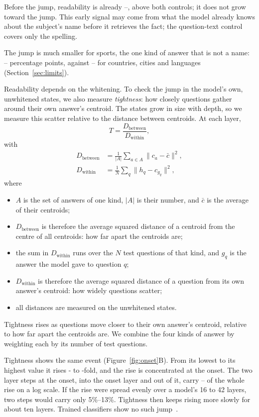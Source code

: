 Before the jump, readability is already \EarlyMin{}--\EarlyMax{}, above both controls; it does not grow toward the jump. This early signal may come from what the model already knows about the subject's name before it retrieves the fact; the question-text control covers only the spelling.

The jump is much smaller for sports, the one kind of answer that is not a name: \SportJumpMin{}--\SportJumpMax{} percentage points, against \NamesJumpMin{}--\NamesJumpMax{} for countries, cities and languages (Section~\ref{sec:limits}).

Readability depends on the whitening. To check the jump in the model's own, unwhitened states, we also measure \emph{tightness}: how closely questions gather around their own answer's centroid. The states grow in size with depth, so we measure this scatter relative to the distance between centroids. At each layer,
\begin{equation}
T = \frac{D_{\text{between}}}{D_{\text{within}}},
\label{eq:tight}
\end{equation}
with
\begin{align*}
D_{\text{between}} &= \frac{1}{|A|} \sum_{a \in A} \lVert c_a - \bar{c} \rVert^2, \\
D_{\text{within}} &= \frac{1}{N} \sum_{q} \lVert h_q - c_{g_q} \rVert^2,
\end{align*}
where
\begin{itemize}\itemsep0pt
\item $A$ is the set of answers of one kind, $|A|$ is their number, and $\bar{c}$ is the average of their centroids;
\item $D_{\text{between}}$ is therefore the average squared distance of a centroid from the centre of all centroids: how far apart the centroids are;
\item the sum in $D_{\text{within}}$ runs over the $N$ test questions of that kind, and $g_q$ is the answer the model gave to question $q$;
\item $D_{\text{within}}$ is therefore the average squared distance of a question from its own answer's centroid: how widely questions scatter;
\item all distances are measured on the unwhitened states.
\end{itemize}
Tightness rises as questions move closer to their own answer's centroid, relative to how far apart the centroids are. We combine the four kinds of answer by weighting each by its number of test questions.

Tightness shows the same event (Figure~\ref{fig:onset}B). From its lowest to its highest value it rises \TightFoldMin{}- to \TightFoldMax{}-fold, and the rise is concentrated at the onset. The two layer steps at the onset, into the onset layer and out of it, carry \TightAtJumpMin{}--\TightAtJumpMax{} of the whole rise on a log scale. If the rise were spread evenly over a model's 16 to 42 layers, two steps would carry only 5\%--13\%. Tightness then keeps rising more slowly for about ten layers. Trained classifiers show no such jump~\citep{he2022a}.

